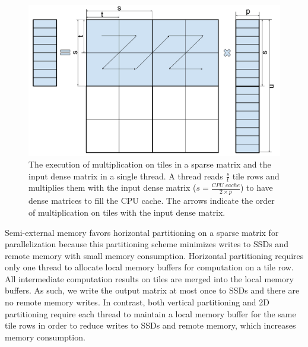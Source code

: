 \begin{figure}
\centering
\includegraphics[scale=0.3]{SpMM_figs/SpMM_exec.pdf}
\caption{The execution of multiplication on tiles in a sparse matrix and
	the input dense matrix in a single thread. A thread reads $\frac{s}{t}$
	tile rows and multiplies them with the input dense matrix
	($s = \frac{CPU\_cache}{2 \times p}$) to have dense matrices to fill
	the CPU cache. The arrows indicate the order
of multiplication on tiles with the input dense matrix.}
\label{spmm_exec}
\end{figure}

Semi-external memory favors horizontal partitioning on a sparse matrix
for parallelization because this partitioning scheme minimizes writes to SSDs
and remote memory with small memory consumption. Horizontal partitioning
requires only one thread to allocate local memory buffers for computation on
a tile row. All intermediate computation results on tiles are merged into
the local memory buffers. As such, we write the output matrix at most once
to SSDs and there are no remote memory writes.
In contrast, both vertical partitioning and 2D partitioning require each
thread to maintain a local memory buffer for the same tile rows in order
to reduce writes to SSDs and remote memory, which increases memory consumption.

